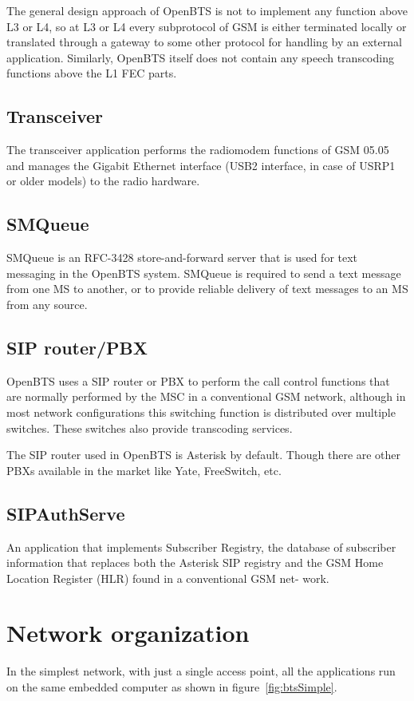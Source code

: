 The general design approach of OpenBTS is not to implement any function above L3 or L4, so at L3 or L4
every subprotocol of GSM is either terminated locally or translated through a gateway to some other protocol
for handling by an external application. Similarly, OpenBTS itself does not contain any speech transcoding
functions above the L1 FEC parts.


\subsection{Transceiver}
The transceiver application performs the radiomodem functions of GSM 05.05 and manages 
the Gigabit Ethernet interface
(USB2 interface, in case
of USRP1 or older models) to the radio hardware.

\subsection{SMQueue}
SMQueue is an RFC-3428 store-and-forward server that is used for 
text messaging in the OpenBTS system. SMQueue is required to send 
a text message from one MS to another, or to provide reliable 
delivery of text messages to an MS from any source.

\subsection{SIP router/PBX}

OpenBTS uses a SIP router or PBX to perform the 
call control functions that are normally performed by the MSC
in a conventional GSM network, although in 
most network configurations this switching
function is distributed over multiple switches. 
These switches also provide transcoding services.

The SIP router used in OpenBTS is Asterisk by default. Though there are other
PBXs available in the market like Yate, FreeSwitch, etc.

\subsection{SIPAuthServe}
An application that implements Subscriber Registry, the database of subscriber 
information that replaces both
the Asterisk SIP registry and the GSM Home Location Register (HLR) 
found in a conventional GSM net-
work.

\section{Network organization}
In the simplest network, with just a single access point, all the applications run
on the same embedded computer as shown in figure~\ref{fig:btsSimple}.

